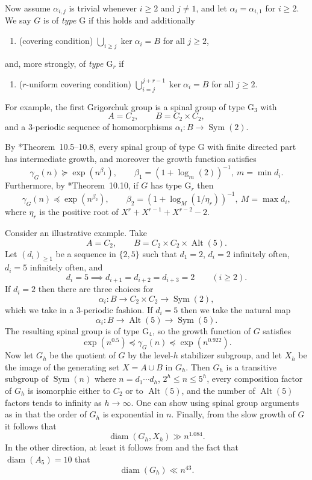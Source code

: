 \documentclass[11pt,reqno]{amsart}
\numberwithin{equation}{section}
\theoremstyle{definition}
\theoremstyle{remark}
\def\G{\mathrm{G}} %
\newcommand\opr[1]{\operatorname{#1}}
\def\Sym{\opr{Sym}}
\def\Alt{\opr{Alt}}
\def\diam{\opr{diam}}
\numberwithin{equation}{section}
\begin{document}
Now assume $\alpha_{i,j}$ is trivial whenever $i \ge 2$ and $j \ne 1$, and let $\alpha_i = \alpha_{i,1}$ for $i \ge 2$.
We say $G$ is of \emph{type $\G$} if this holds and additionally
\begin{enumerate}[resume]
   \item (covering condition) $\bigcup_{i \ge j} \ker \alpha_i = B$ for all $j \ge 2$,
\end{enumerate}
and, more strongly, of \emph{type $\G_r$} if
\begin{enumerate}[resume]
    \item[($3_r$)] ($r$-uniform covering condition) $\bigcup_{i = j}^{j + r - 1} \ker \alpha_i = B$ for all $j \ge 2$.
\end{enumerate}
For example, the first Grigorchuk group is a spinal group of type $\G_3$ with
\[
    A = C_2, \qquad B = C_2 \times C_2,
\]
and a $3$-periodic sequence of homomorphisms $\alpha_i : B \to \Sym(2)$.

By \cite{BGS-branch-groups-book}*{Theorem~10.5--10.8}, every spinal group of type $\G$ with finite directed part has intermediate growth, and moreover the growth function satisfies
\[
    \gamma_G(n) \succeq \exp(n^{\beta_1}), \qquad \beta_1 = (1 + \log_m(2))^{-1}, ~ m = \min d_i.
\]
Furthermore, by \cite{BGS-branch-groups-book}*{Theorem~10.10}, if $G$ has type $\G_r$ then
\[
    \gamma_G(n) \preceq \exp(n^{\beta_2}), \qquad \beta_2 = (1 + \log_M(1/\eta_r))^{-1}, ~ M = \max d_i,
\]
where $\eta_r$ is the positive root of $X^r + X^{r-1} + X^{r-2} - 2$.

Consider an illustrative example. Take
\[
    A = C_2, \qquad B = C_2 \times C_2 \times \Alt(5).
\]
Let $(d_i)_{\ge 1}$ be a sequence in $\{2, 5\}$ such that $d_1 = 2$, $d_i = 2$ infinitely often, $d_i = 5$ infinitely often, and
\[
    d_i = 5 \implies d_{i+1} = d_{i+2} = d_{i+3} = 2 \qquad (i \ge 2).
\]
If $d_i = 2$ then there are three choices for
\[\alpha_i : B \to C_2 \times C_2 \to \Sym(2),\]
which we take in a $3$-periodic fashion.
If $d_i = 5$ then we take the natural map
\[\alpha_i : B \to \Alt(5) \to \Sym(5).\]
The resulting spinal group is of type $\G_4$, so the growth function of $G$ satisfies
\[
    \exp(n^{0.5}) \preceq \gamma_G(n) \preceq \exp(n^{0.922}).
\]
Now let $G_h$ be the quotient of $G$ by the level-$h$ stabilizer subgroup,
and let $X_h$ be the image of the generating set $X = A \cup B$ in $G_h$.
Then $G_h$ is a transitive subgroup of $\Sym(n)$ where $n = d_1 \cdots d_h$, $2^h \le n \le 5^h$,
every composition factor of $G_h$ is isomorphic either to $C_2$ or to $\Alt(5)$,
and the number of $\Alt(5)$ factors tends to infinity as $h \to \infty$.
One can show using spinal group arguments as in \cite{BGS-branch-groups-book} that the order of $G_h$ is exponential in $n$.
Finally, from the slow growth of $G$ it follows that
\[
    \diam(G_h, X_h) \gg n^{1.084}.
\]
In the other direction, at least it follows from  and the fact that $\diam(A_5) = 10$ that
\[
    \diam(G_h) \ll n^{43}.
\]
\end{document}
